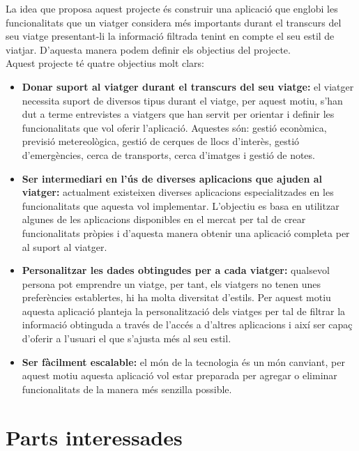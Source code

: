 La idea que proposa aquest projecte és construir una aplicació que englobi les funcionalitats que un viatger considera més importants durant el transcurs del seu viatge presentant-li la informació filtrada tenint en compte el seu estil de viatjar. D'aquesta manera podem definir els objectius del projecte.\\

Aquest projecte té quatre objectius molt clars:
\begin{itemize}
\item{\textbf{Donar suport al viatger durant el transcurs del seu viatge:}} el viatger necessita suport de diversos tipus durant el viatge, per aquest motiu, s'han dut a terme entrevistes a viatgers que han servit per orientar i definir les funcionalitats que vol oferir l'aplicació. Aquestes són: gestió econòmica, previsió metereològica, gestió de cerques de llocs d'interès, gestió d'emergències, cerca de transports, cerca d'imatges i gestió de notes.\\

\item{\textbf{Ser intermediari en l'ús de diverses aplicacions que ajuden al viatger:}} actualment existeixen diverses aplicacions especialitzades en les funcionalitats que aquesta vol implementar. L'objectiu es basa en utilitzar algunes de les aplicacions disponibles en el mercat per tal de crear funcionalitats pròpies i d'aquesta manera obtenir una aplicació completa per al suport al viatger.

\item{\textbf{Personalitzar les dades obtingudes per a cada viatger:}} qualsevol persona pot emprendre un viatge, per tant, els viatgers no tenen unes preferències establertes, hi ha molta diversitat d'estils. Per aquest motiu aquesta aplicació planteja la personalització dels viatges per tal de filtrar la informació obtinguda a través de l'accés a d'altres aplicacions i així ser capaç d'oferir a l'usuari el que s'ajusta més al seu estil.

\item{\textbf{Ser fàcilment escalable:}} el món de la tecnologia és un món canviant, per aquest motiu aquesta aplicació vol estar preparada per agregar o eliminar funcionalitats de la manera més senzilla possible.

\end{itemize}

\section{Parts interessades}

